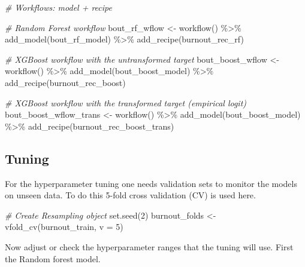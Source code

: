 \documentclass[
]{book}
\newenvironment{Shaded}{\begin{snugshade}}{\end{snugshade}}
\newcommand{\AttributeTok}[1]{\textcolor[rgb]{0.77,0.63,0.00}{#1}}
\newcommand{\CommentTok}[1]{\textcolor[rgb]{0.56,0.35,0.01}{\textit{#1}}}
\newcommand{\DecValTok}[1]{\textcolor[rgb]{0.00,0.00,0.81}{#1}}
\newcommand{\FunctionTok}[1]{\textcolor[rgb]{0.00,0.00,0.00}{#1}}
\newcommand{\NormalTok}[1]{#1}
\newcommand{\OtherTok}[1]{\textcolor[rgb]{0.56,0.35,0.01}{#1}}
\newcommand{\SpecialCharTok}[1]{\textcolor[rgb]{0.00,0.00,0.00}{#1}}
\begin{document}
\begin{Shaded}
\begin{Highlighting}[]
\CommentTok{\# Workflows: model + recipe}

\CommentTok{\# Random Forest workflow}
\NormalTok{bout\_rf\_wflow }\OtherTok{\textless{}{-}}
  \FunctionTok{workflow}\NormalTok{() }\SpecialCharTok{\%\textgreater{}\%}
  \FunctionTok{add\_model}\NormalTok{(bout\_rf\_model) }\SpecialCharTok{\%\textgreater{}\%}
  \FunctionTok{add\_recipe}\NormalTok{(burnout\_rec\_rf)}

\CommentTok{\# XGBoost workflow with the untransformed target}
\NormalTok{bout\_boost\_wflow }\OtherTok{\textless{}{-}}
  \FunctionTok{workflow}\NormalTok{() }\SpecialCharTok{\%\textgreater{}\%}
  \FunctionTok{add\_model}\NormalTok{(bout\_boost\_model) }\SpecialCharTok{\%\textgreater{}\%}
  \FunctionTok{add\_recipe}\NormalTok{(burnout\_rec\_boost)}

\CommentTok{\# XGBoost workflow with the transformed target (empirical logit)}
\NormalTok{bout\_boost\_wflow\_trans }\OtherTok{\textless{}{-}}
  \FunctionTok{workflow}\NormalTok{() }\SpecialCharTok{\%\textgreater{}\%}
  \FunctionTok{add\_model}\NormalTok{(bout\_boost\_model) }\SpecialCharTok{\%\textgreater{}\%}
  \FunctionTok{add\_recipe}\NormalTok{(burnout\_rec\_boost\_trans)}
\end{Highlighting}
\end{Shaded}

\hypertarget{tuning}{%
\subsection{Tuning}\label{tuning}}

For the hyperparameter tuning one needs validation sets to monitor the models on unseen data. To do this 5-fold cross validation (CV) is used here.

\begin{Shaded}
\begin{Highlighting}[]
\CommentTok{\# Create Resampling object}
\FunctionTok{set.seed}\NormalTok{(}\DecValTok{2}\NormalTok{)}
\NormalTok{burnout\_folds }\OtherTok{\textless{}{-}} \FunctionTok{vfold\_cv}\NormalTok{(burnout\_train, }\AttributeTok{v =} \DecValTok{5}\NormalTok{)}
\end{Highlighting}
\end{Shaded}

Now adjust or check the hyperparameter ranges that the tuning will use. First the Random forest model.
\end{document}

